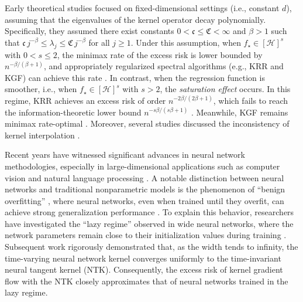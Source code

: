 \documentclass{article}
\theoremstyle{plain}
\theoremstyle{definition}
\theoremstyle{remark}
\begin{document}
Early theoretical studies focused on fixed-dimensional settings (i.e., constant $d$), assuming that the eigenvalues of the kernel operator decay polynomially. Specifically, they assumed there exist constants $0 < \mathfrak{c} \le \mathfrak{C} < \infty$ and $\beta > 1$ such that $\mathfrak{c}\, j^{-\beta} \le \lambda_j \le \mathfrak{C}\, j^{-\beta}$ for all $j \ge 1$.
Under this assumption, when $f_{\star} \in [\mathcal{H}]^{s}$ with $0 < s \leq 2$, the minimax rate of the excess risk is lower bounded by $n^{-{\beta}/({\beta+1})}$, and appropriately regularized spectral algorithms (e.g., KRR and KGF) can achieve this rate \citep{Caponnetto2006OptimalRF, caponnetto2007optimal, raskutti2014early, Yao2007OnES, Lin_Optimal_2020, zhang2023optimality}. 
In contrast, when the regression function is smoother, i.e., when $f_{\star} \in [\mathcal{H}]^{s}$ with $s > 2$, the \emph{saturation effect} occurs. In this regime, KRR achieves an excess risk of order $n^{-{2\beta}/({2\beta+1})}$, which fails to reach the information-theoretic lower bound $n^{-{s\beta}/({s\beta+1})}$ \citep{bauer2007_RegularizationAlgorithms, Gerfo_spectral_2008, dicker2017kernel, li2022saturation}. Meanwhile, KGF remains minimax rate-optimal \citep{Yao2007OnES, Lin_Optimal_2020}. 
Moreover, several studies discussed the inconsistency of kernel interpolation \citep{pmlr-v99-rakhlin19a, beaglehole2022kernel, buchholz2022_KernelInterpolation, li2023kernel}. 

Recent years have witnessed significant advances in neural network methodologies, especially in large-dimensional applications such as computer vision \citep{he2016deep, krizhevsky2017imagenet} and natural language processing \citep{Devlin_BERT_2019}. 
A notable distinction between neural networks and traditional nonparametric models is the phenomenon of ``benign overfitting'' \citep{bartlett2020benign, frei2022benign, mallinar2022benign, sanyal2020benign}, where neural networks, even when trained until they overfit, can achieve strong generalization performance \citep{zhang2016understanding, zhang2021understanding, belkin2018understand, belkin2019does, belkin2021fit, nakkiran2021deep}.
To explain this behavior, researchers have investigated the ``lazy regime'' observed in wide neural networks, where the network parameters remain close to their initialization values during training \citep{arora2019fine, Du_gradient_2019_b, Du_gradient_2019_a, li2018learning}. 
Subsequent work \citep{Jacot_NTK_2018, Arora_on_2019, Hu_Regularization_2021, Namjoon_Non_2022, jianfa2022generalization, li2023statistical} rigorously demonstrated that, as the width tends to infinity, the time-varying neural network kernel converges uniformly to the time-invariant neural tangent kernel (NTK). Consequently, the excess risk of kernel gradient flow with the NTK closely approximates that of neural networks trained in the lazy regime.
\end{document}
